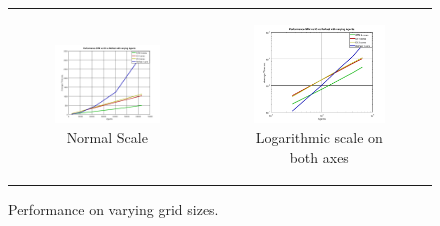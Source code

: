 \begin{figure}
\begin{center}
	\begin{tabular}{c c}
		\begin{subfigure}[b]{0.5\textwidth}
			\centering
			\includegraphics[width=1\textwidth, angle=0]{./fig/sir/stm_io_repast_varyinggrid_performance.png}
			\caption{Normal Scale}
		\end{subfigure}
    	&
		\begin{subfigure}[b]{0.5\textwidth}
			\centering
			\includegraphics[width=1\textwidth, angle=0]{./fig/sir/stm_io_repast_varyinggrid_performance_loglog.png}
			\caption{Logarithmic scale on both axes}
		\end{subfigure}
    \end{tabular}
	\caption{Performance on varying grid sizes.}
	\label{fig:stm_io_repast_varyinggrid_performance}
\end{center}
\end{figure}

